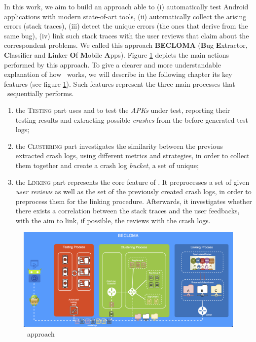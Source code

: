 \label{chapter:approach}
In this work, we aim to build an approach able to (i) automatically test Android applications with modern state-of-art tools, (ii) automatically collect the arising errors (\ie stack traces), (iii) detect the unique errors (\ie the ones that derive from the same bug), (iv) link such stack traces with the user reviews that claim about the correspondent problems.           
We called this approach \textbf{BECLOMA} (\textbf{B}ug \textbf{E}xtractor, \textbf{C}lassifier and \textbf{L}inker \textbf{O}f \textbf{M}obile \textbf{A}pps).
Figure \ref{fig: becloma} depicts the main actions performed by this approach.
To give a clearer and more understandable explanation of how \toolname\ works, we will describe in the following chapter its key features (see figure \ref{fig: becloma}). Such features represent the three main processes that \toolname\ sequentially performs.
\begin{enumerate}
\item the \textsc{Testing} part uses \monkey and \sapienz to test the \textit{APKs} under test, reporting their testing results and extracting possible \textit{crashes} from the before generated test logs; 

\item the \textsc{Clustering} part investigates the similarity between the previous extracted crash logs, using different metrics and strategies, in order to collect them together and create a crash log \textit{bucket}, \ie a set of unique; 

\item the \textsc{Linking} part represents the core feature of \toolname. It preprocesses a set of given \textit{user reviews} as well as the set of the previously created crash logs, in order to preprocess them for the linking procedure. Afterwards, it investigates whether there exists a correlation between the stack traces and the user feedbacks, with the aim to link, if possible, the reviews with the crash logs. 
\end{enumerate}
\begin{figure}[tb]
\centering 
\includegraphics[width=\columnwidth]{diagrams/becloma_approach_img} 
\caption{\toolname\ approach}
\label{fig: becloma}
\end{figure}


